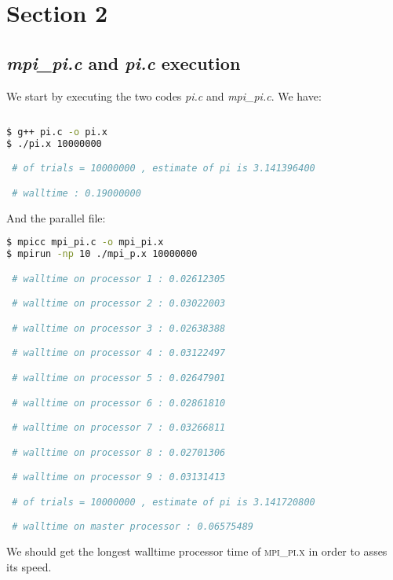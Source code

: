 \documentclass[11pt]{scrartcl} %
\begin{document}
\section{Section 2}

\subsection{\textit{mpi\_pi.c} and \textit{pi.c} execution}
We start by executing the two codes \textit{pi.c} and \textit{mpi\_pi.c}. We have:

\begin{lstlisting}[language=bash]
  
$ g++ pi.c -o pi.x
$ ./pi.x 10000000

 # of trials = 10000000 , estimate of pi is 3.141396400 

 # walltime : 0.19000000 
\end{lstlisting}
And the parallel file:
\begin{lstlisting}[language=bash]
$ mpicc mpi_pi.c -o mpi_pi.x
$ mpirun -np 10 ./mpi_p.x 10000000

 # walltime on processor 1 : 0.02612305 

 # walltime on processor 2 : 0.03022003 

 # walltime on processor 3 : 0.02638388 

 # walltime on processor 4 : 0.03122497 

 # walltime on processor 5 : 0.02647901 

 # walltime on processor 6 : 0.02861810 

 # walltime on processor 7 : 0.03266811 

 # walltime on processor 8 : 0.02701306 

 # walltime on processor 9 : 0.03131413 

 # of trials = 10000000 , estimate of pi is 3.141720800 

 # walltime on master processor : 0.06575489 

\end{lstlisting}

We should get the longest walltime processor time of \textsc{mpi\_pi.x} in order to asses its speed.
\end{document}
